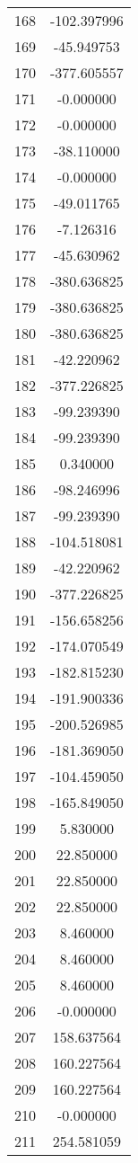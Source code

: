 \documentclass[12pt]{article}
\begin{document}
\begin{longtable}{@{}cc@{}}
168 & -102.397996 \\
169 & -45.949753 \\
170 & -377.605557 \\
171 & -0.000000 \\
172 & -0.000000 \\
173 & -38.110000 \\
174 & -0.000000 \\
175 & -49.011765 \\
176 & -7.126316 \\
177 & -45.630962 \\
178 & -380.636825 \\
179 & -380.636825 \\
180 & -380.636825 \\
181 & -42.220962 \\
182 & -377.226825 \\
183 & -99.239390 \\
184 & -99.239390 \\
185 & 0.340000 \\
186 & -98.246996 \\
187 & -99.239390 \\
188 & -104.518081 \\
189 & -42.220962 \\
190 & -377.226825 \\
191 & -156.658256 \\
192 & -174.070549 \\
193 & -182.815230 \\
194 & -191.900336 \\
195 & -200.526985 \\
196 & -181.369050 \\
197 & -104.459050 \\
198 & -165.849050 \\
199 & 5.830000 \\
200 & 22.850000 \\
201 & 22.850000 \\
202 & 22.850000 \\
203 & 8.460000 \\
204 & 8.460000 \\
205 & 8.460000 \\
206 & -0.000000 \\
207 & 158.637564 \\
208 & 160.227564 \\
209 & 160.227564 \\
210 & -0.000000 \\
211 & 254.581059 \\

\end{longtable}
\end{document}
